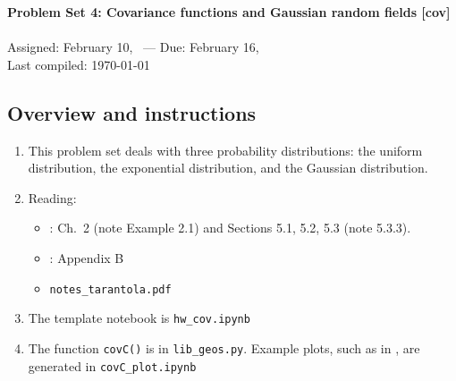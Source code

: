 \documentclass[11pt,titlepage,fleqn]{article}
\newcommand{\tfile}{{\tt hw\_cov.ipynb}}
\begin{document}

\begin{spacing}{1.2}
\centering
{\large \bf Problem Set 4: Covariance functions and Gaussian random fields [cov]} \\
\cltag\ \\
Assigned: February 10, \cyear\ --- Due: February 16, \cyear\ \\
Last compiled: \today
\end{spacing}


\subsection*{Overview and instructions}

\begin{enumerate}
\item This problem set deals with three probability distributions: the uniform distribution, the exponential distribution, and the Gaussian distribution.

\item Reading:
\begin{itemize}
\item \citet{Tarantola2005}: Ch.~2 (note Example 2.1) and Sections 5.1, 5.2, 5.3 (note 5.3.3).
\item \citet{Aster}: Appendix B
\item \verb+notes_tarantola.pdf+
\end{itemize}

\item The template notebook is \tfile
\item The function \verb+covC()+ is in \verb+lib_geos.py+. Example plots, such as in , are generated in \verb+covC_plot.ipynb+
\end{enumerate}

\end{document}
